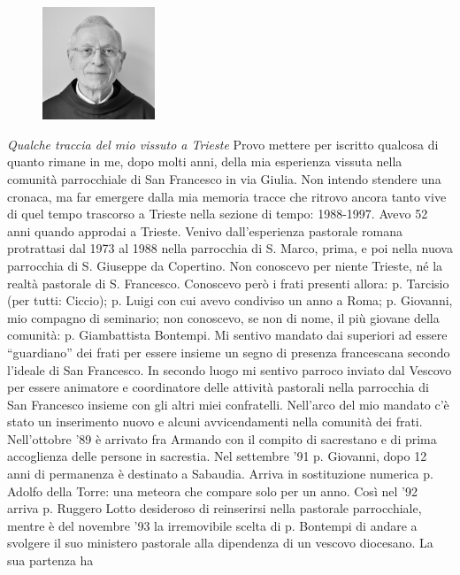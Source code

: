 \begin{figure}
\centering
\includegraphics[width=0.30\textwidth]{immagini/lorenzo.jpg}
\end{figure}
\noindent \textit{Qualche traccia del mio vissuto a Trieste}
\medbreak
\noindent Provo mettere per iscritto qualcosa di quanto rimane in me, dopo molti anni, della mia
esperienza vissuta nella comunità parrocchiale di San Francesco in via Giulia. 
Non intendo stendere una cronaca, ma far emergere dalla mia memoria tracce che ritrovo ancora 
tanto vive di quel tempo trascorso a Trieste nella sezione di tempo: 1988-1997.
Avevo 52 anni quando approdai a Trieste. Venivo dall’esperienza pastorale romana protrattasi dal 
1973 al 1988 nella parrocchia di S. Marco, prima, e poi nella nuova parrocchia di S. Giuseppe da 
Copertino.
Non conoscevo per niente Trieste, né la realtà pastorale di S. Francesco. Conoscevo però i 
frati presenti allora: p. Tarcisio (per tutti: Ciccio); p. Luigi con cui avevo condiviso un anno a 
Roma; p. Giovanni, mio compagno di seminario; non conoscevo, se non di nome, il più giovane 
della comunità: p. Giambattista Bontempi.
Mi sentivo mandato dai superiori ad essere “guardiano” dei frati per essere insieme un segno di 
presenza francescana secondo l'ideale di San Francesco. In secondo luogo mi sentivo parroco 
inviato dal Vescovo per essere animatore e coordinatore delle attività pastorali nella parrocchia di 
San Francesco insieme con gli altri miei confratelli.
Nell'arco del mio mandato c'è stato un inserimento nuovo e alcuni avvicendamenti nella 
comunità dei frati. Nell'ottobre '89 è arrivato fra Armando con il compito di sacrestano e di prima 
accoglienza delle persone in sacrestia. Nel settembre '91 p. Giovanni, dopo 12 anni di permanenza è 
destinato a Sabaudia. Arriva in sostituzione numerica p. Adolfo della Torre: una meteora che 
compare solo per un anno. Così nel '92 arriva p. Ruggero Lotto desideroso di reinserirsi nella 
pastorale parrocchiale, mentre  è del novembre '93 la irremovibile scelta di p. Bontempi di andare a 
svolgere il suo ministero pastorale alla dipendenza di un vescovo diocesano. La sua partenza ha 
